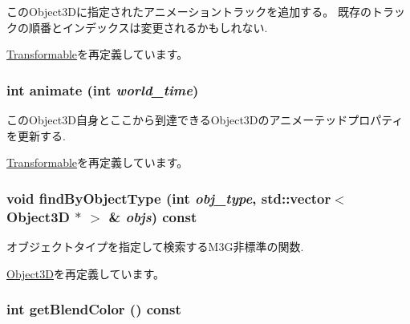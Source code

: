 このObject3Dに指定されたアニメーショントラックを追加する。 既存のトラックの順番とインデックスは変更されるかもしれない. 

\hyperlink{classm3g_1_1Transformable_415c0b110f95410ded9b85e5d99a496b}{Transformable}を再定義しています。\hypertarget{classm3g_1_1Texture2D_82cfeb67ca66b93e2ca7bda9a4f0e2aa}{
\subsubsection[{animate}]{\setlength{\rightskip}{0pt plus 5cm}int animate (int {\em world\_\-time})}}
\label{classm3g_1_1Texture2D_82cfeb67ca66b93e2ca7bda9a4f0e2aa}


このObject3D自身とここから到達できるObject3Dのアニメーテッドプロパティを更新する. 

\hyperlink{classm3g_1_1Transformable_8aad1ceab4c2a03609c8a42324ce484d}{Transformable}を再定義しています。\hypertarget{classm3g_1_1Texture2D_4dadb21b568b0230fac106f15040138c}{
\subsubsection[{findByObjectType}]{\setlength{\rightskip}{0pt plus 5cm}void findByObjectType (int {\em obj\_\-type}, \/  std::vector$<$ {\bf Object3D} $\ast$ $>$ \& {\em objs}) const}}
\label{classm3g_1_1Texture2D_4dadb21b568b0230fac106f15040138c}


オブジェクトタイプを指定して検索するM3G非標準の関数. 

\hyperlink{classm3g_1_1Object3D_4dadb21b568b0230fac106f15040138c}{Object3D}を再定義しています。\hypertarget{classm3g_1_1Texture2D_b7dc7b7bf2934448281894f2c1ef3638}{
\subsubsection[{getBlendColor}]{\setlength{\rightskip}{0pt plus 5cm}int getBlendColor () const}}
\label{classm3g_1_1Texture2D_b7dc7b7bf2934448281894f2c1ef3638}


